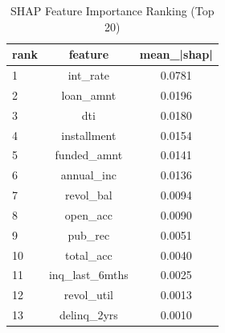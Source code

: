 \begin{table}
\centering
\caption{SHAP Feature Importance Ranking (Top 20)}
\label{tab:shap_ranking}
\begin{tabular}{lcc}
\toprule
rank & feature & mean_|shap| \\
\midrule
1 & int_rate & 0.0781 \\
2 & loan_amnt & 0.0196 \\
3 & dti & 0.0180 \\
4 & installment & 0.0154 \\
5 & funded_amnt & 0.0141 \\
6 & annual_inc & 0.0136 \\
7 & revol_bal & 0.0094 \\
8 & open_acc & 0.0090 \\
9 & pub_rec & 0.0051 \\
10 & total_acc & 0.0040 \\
11 & inq_last_6mths & 0.0025 \\
12 & revol_util & 0.0013 \\
13 & delinq_2yrs & 0.0010 \\
\bottomrule
\end{tabular}
\end{table}
